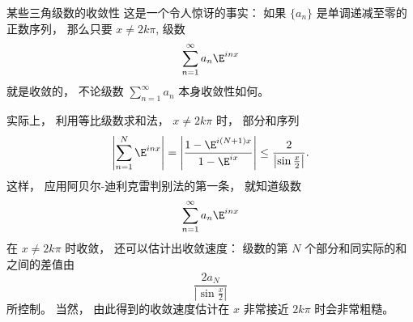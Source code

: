 \begin{example}{某些三角级数的收敛性}
这是一个令人惊讶的事实： 如果 $\{a_n\}$ 是单调递减至零的正数序列， 那么只要 $x\neq 2k\pi$, 级数
$$
\sum_{n=1}^\infty a_n \E^{inx}
$$
就是收敛的， 不论级数 $\sum_{n=1}^\infty a_n$ 本身收敛性如何。

实际上， 利用等比级数求和法， $x\neq 2k\pi$ 时， 部分和序列
$$
\left|\sum_{n=1}^N\E^{inx}\right|
=\left|\frac{1-\E^{i(N+1)x}}{1-\E^{ix}}\right|
\leq\frac{2}{\left|\sin\frac{x}{2}\right|}.
$$
这样， 应用阿贝尔-迪利克雷判别法的第一条， 就知道级数
$$
\sum_{n=1}^\infty a_n \E^{inx}
$$
在 $x\neq 2k\pi$ 时收敛， 还可以估计出收敛速度： 级数的第 $N$ 个部分和同实际的和之间的差值由
$$
\frac{2a_N}{\left|\sin\frac{x}{2}\right|}
$$
所控制。 当然， 由此得到的收敛速度估计在 $x$ 非常接近 $2k\pi$ 时会非常粗糙。
\end{example}